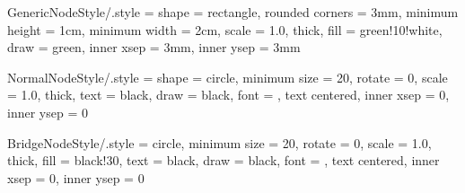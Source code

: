 \tikzset
{
	GenericNodeStyle/.style =
	{
		shape = rectangle,							%
		rounded corners	= 3mm,					%
		minimum height	= 1cm,					%
		minimum width	= 2cm,					%
		scale			= 1.0,					%
		thick,									%
		fill			= green!10!white,				%
		draw			= green,				%
		inner xsep		= 3mm,					%
		inner ysep		= 3mm					%
	}
}






\tikzset
{
	NormalNodeStyle/.style =
	{
		shape = circle,							%
		minimum size	= 20,					%
		rotate			= 0,					%
		scale			= 1.0,					%
		thick,									%
		text			= black,				%
		draw			= black,				%
		font			= \small,				%
		text centered,							%
		inner xsep		= 0,					%
		inner ysep		= 0						%
	}
}



\tikzset
{
	BridgeNodeStyle/.style =
	{
		circle,									%
		minimum size	= 20,					%
		rotate			= 0,					%
		scale			= 1.0,					%
		thick,									%
		fill			= black!30,				%
		text			= black,				%
		draw			= black,				%
		font			= \small,				%
		text centered,							%
		inner xsep		= 0,					%
		inner ysep		= 0						%
	}
}










